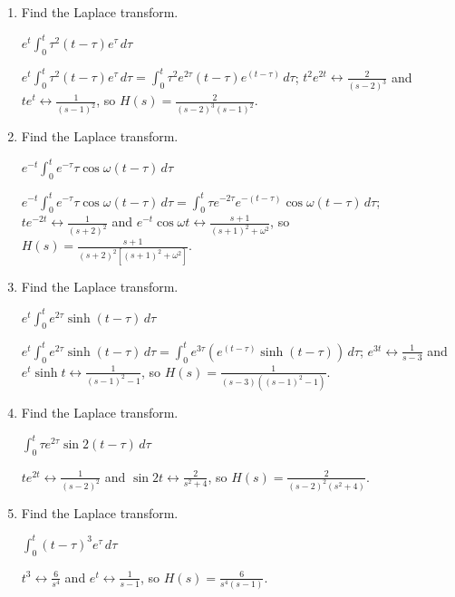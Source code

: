 \documentclass{ximera}
\begin{document}
\begin{problem}
\begin{enumerate}
\item Find the Laplace transform. 

$e^t\int_0^t\tau^2 (t-\tau)e^\tau\,d\tau$

\begin{solution}
$e^t\int_0^t\tau^2
(t-\tau)e^\tau\,d\tau = \int_0^t\tau^2e^{2\tau}(t-\tau)e^{(t-\tau)}\,d\tau$;
$t^2e^{2t}\leftrightarrow\frac{2}{(s-2)^3}$ and
$te^t\leftrightarrow\frac{1}{(s-1)^2}$, so
 $H(s)=\frac{2}{(s-2)^3 (s-1)^2}$.
\end{solution}

\item Find the Laplace transform. 

$e^{-t}\int_0^t e^{-\tau}\tau\cos\omega (t-\tau)\,d\tau$

\begin{solution}
$e^{-t}\int_0^t e^{-\tau}\tau\cos\omega
(t-\tau)\,d\tau=
\int_0^t\tau e^{-2\tau}e^{-(t-\tau)}\cos\omega(t-\tau)\,d\tau$;
$te^{-2t}\leftrightarrow\frac{1}{(s+2)^2}$ and
$e^{-t}\cos\omega t\leftrightarrow\frac{s+1}{(s+1)^2+\omega^2}$, so
$H(s)=\frac{s+1}{(s+2)^2\left[(s+1)^2+
\omega^2\right]}$.
\end{solution}

\item Find the Laplace transform. 

$e^t\int_0^t e^{2\tau}\sinh
(t-\tau)\,d\tau$

\begin{solution}
$e^t\int_0^t e^{2\tau}\sinh (t-\tau)\,d\tau=
\int_0^t e^{3\tau}\left(e^{(t-\tau)}\sinh
(t-\tau)\right)\,d\tau$; $e^{3t}\leftrightarrow\frac{1}{s-3}$ and
$e^t\sinh t\leftrightarrow\frac{1}{(s-1)^2-1}$, so
$H(s)=\frac{1}{(s-3)\left((s-1)^2-1\right)}$.
\end{solution}

\item Find the Laplace transform. 

$\int_0^t\tau e^{2\tau}\sin
2(t-\tau)\,d\tau$

\begin{solution}
$te^{2t}\leftrightarrow\frac{1}{(s-2)^2}$ and
$\sin2t\leftrightarrow\frac{2}{s^2+4}$, so
 $H(s)=\frac{2}{(s-2)^2(s^2+4)}$.
\end{solution}

\item Find the Laplace transform. 

$\int_0^t (t-\tau)^3 e^\tau\, d\tau$

\begin{solution}
$t^3\leftrightarrow\frac{6}{s^4}$  and
$e^t\leftrightarrow\frac{1}{s-1}$, so
$H(s)=\frac{6}{s^4(s-1)}$.
\end{solution}


\end{enumerate}
\end{problem}
\end{document}
